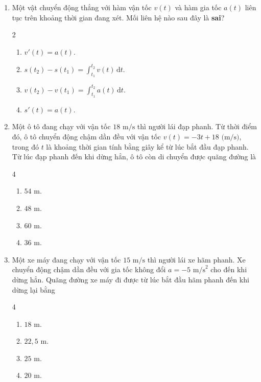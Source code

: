 \documentclass[12pt]{article}
\begin{document}
\begin{enumerate}[label=\textbf{Câu \arabic*.}]
		\item Một vật chuyển động thẳng với hàm vận tốc $v(t)$ và hàm gia tốc $a(t)$ liên tục trên khoảng thời gian đang xét. Mối liên hệ nào sau đây là \textbf{sai}?
		\begin{multicols}{2}
			\begin{enumerate}[label=\textbf{\Alph*.}]
				\item $v'(t) = a(t)$.
				\item $s(t_2) - s(t_1) = \displaystyle \int_{t_1}^{t_2} v(t)\,\mathrm{d}t$.
				\item $v(t_2) - v(t_1) = \displaystyle \int_{t_1}^{t_2} a(t)\,\mathrm{d}t$.
				\item $s'(t) = a(t)$.
			\end{enumerate}
		\end{multicols}
		
		\item Một ô tô đang chạy với vận tốc $18\text{ m/s}$ thì người lái đạp phanh. Từ thời điểm đó, ô tô chuyển động chậm dần đều với vận tốc $v(t) = -3t + 18\text{ (m/s)}$, trong đó $t$ là khoảng thời gian tính bằng giây kể từ lúc bắt đầu đạp phanh. Từ lúc đạp phanh đến khi dừng hẳn, ô tô còn di chuyển được quãng đường là
		\begin{multicols}{4}
			\begin{enumerate}[label=\textbf{\Alph*.}]
				\item $54\text{ m}$.
				\item $48\text{ m}$.
				\item $60\text{ m}$.
				\item $36\text{ m}$.
			\end{enumerate}
		\end{multicols}
		
		\item Một xe máy đang chạy với vận tốc $15\text{ m/s}$ thì người lái xe hãm phanh. Xe chuyển động chậm dần đều với gia tốc không đổi $a = -5\text{ m/s}^2$ cho đến khi dừng hẳn. Quãng đường xe máy đi được từ lúc bắt đầu hãm phanh đến khi dừng lại bằng
		\begin{multicols}{4}
			\begin{enumerate}[label=\textbf{\Alph*.}]
				\item $18\text{ m}$.
				\item $22{,}5\text{ m}$.
				\item $25\text{ m}$.
				\item $20\text{ m}$.
			\end{enumerate}
		\end{multicols}
		

\end{enumerate}
\end{document}
